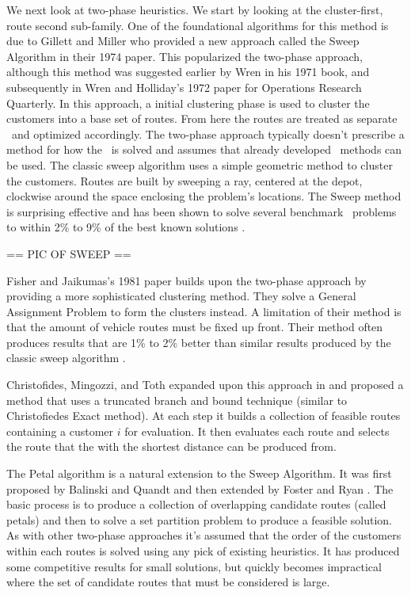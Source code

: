 We next look at two-phase heuristics. We start by looking at the cluster-first, route second sub-family. One of the foundational algorithms for this method is due to Gillett and Miller who provided a new approach called the Sweep Algorithm in their 1974 paper\cite{GM:1974}. This popularized the two-phase approach, although this method was suggested earlier by Wren in his 1971 book, and subsequently in Wren and Holliday's 1972 paper for Operations Research Quarterly. In this approach, a initial clustering phase is used to cluster the customers into a base set of routes. From here the routes are treated as separate \TSP\ and optimized accordingly. The two-phase approach typically doesn't prescribe a method for how the \TSP\ is solved and assumes that already developed \TSP\ methods can be used. The classic sweep algorithm uses a simple geometric method to cluster the customers. Routes are built by sweeping a ray, centered at the depot, clockwise around the space enclosing the problem's locations. The Sweep method is surprising effective and has been shown to solve several benchmark \VRP\ problems to within 2\% to 9\% of the best known solutions \cite{TV2001}.

== PIC OF SWEEP == 

Fisher and Jaikumas's 1981 paper builds upon the two-phase approach by providing a more sophisticated clustering method. They solve a General Assignment Problem to form the clusters instead. A limitation of their method is that the amount of vehicle routes must be fixed up front. Their method often produces results that are 1\% to 2\% better than similar results produced by the classic sweep algorithm \cite{TV2001}. 

Christofides, Mingozzi, and Toth expanded upon this approach in \cite{???} and proposed a method that uses a truncated branch and bound technique (similar to Christofiedes Exact method). At each step it builds a collection of feasible routes containing a customer $i$ for evaluation. It then evaluates each route and selects the route that the \TSP with the shortest distance can be produced from.

The Petal algorithm is a natural extension to the Sweep Algorithm. It was first proposed by Balinski and Quandt \cite{??} and then extended by Foster and Ryan \cite{??}. The basic process is to produce a collection of overlapping candidate routes (called petals) and then to solve a set partition problem to produce a feasible solution. As with other two-phase approaches it's assumed that the order of the customers within each routes is solved using any pick of existing \TSP heuristics. It has produced some competitive results for small solutions, but quickly becomes impractical where the set of candidate routes that must be considered is large.  

